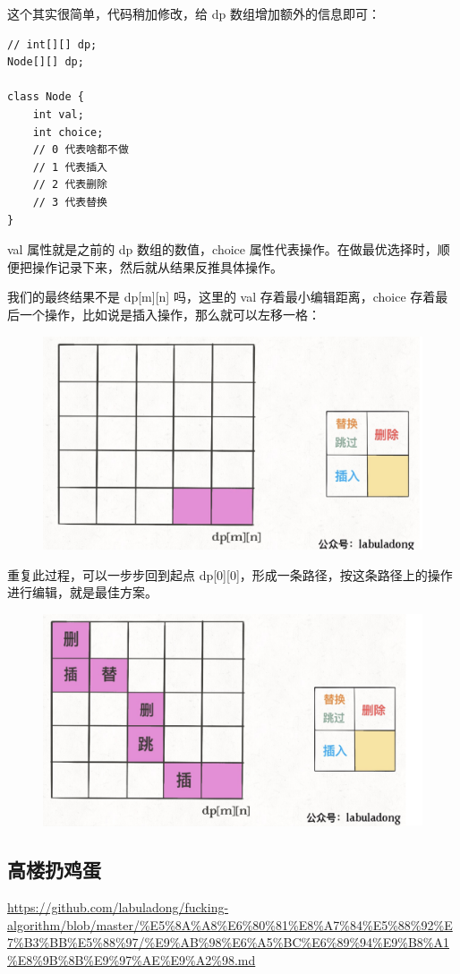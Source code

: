 \documentclass[12pt]{article}
\begin{document}
这个其实很简单，代码稍加修改，给 dp 数组增加额外的信息即可：
\begin{lstlisting}
// int[][] dp;
Node[][] dp;

class Node {
    int val;
    int choice;
    // 0 代表啥都不做
    // 1 代表插入
    // 2 代表删除
    // 3 代表替换
}
\end{lstlisting}

val 属性就是之前的 dp 数组的数值，choice 属性代表操作。在做最优选择时，顺便把操作记录下来，然后就从结果反推具体操作。

我们的最终结果不是 dp[m][n] 吗，这里的 val 存着最小编辑距离，choice 存着最后一个操作，比如说是插入操作，那么就可以左移一格：
\begin{figure}[H]
    \centering
    \includegraphics[width=.6\textwidth]{fig/Dynamic_Programming_Edit_Distance_4.png}
\end{figure}

重复此过程，可以一步步回到起点 dp[0][0]，形成一条路径，按这条路径上的操作进行编辑，就是最佳方案。
\begin{figure}[H]
    \centering
    \includegraphics[width=.6\textwidth]{fig/Dynamic_Programming_Edit_Distance_5.png}
\end{figure}

\subsection{高楼扔鸡蛋}
\url{https://github.com/labuladong/fucking-algorithm/blob/master/%E5%8A%A8%E6%80%81%E8%A7%84%E5%88%92%E7%B3%BB%E5%88%97/%E9%AB%98%E6%A5%BC%E6%89%94%E9%B8%A1%E8%9B%8B%E9%97%AE%E9%A2%98.md}
\end{document}

